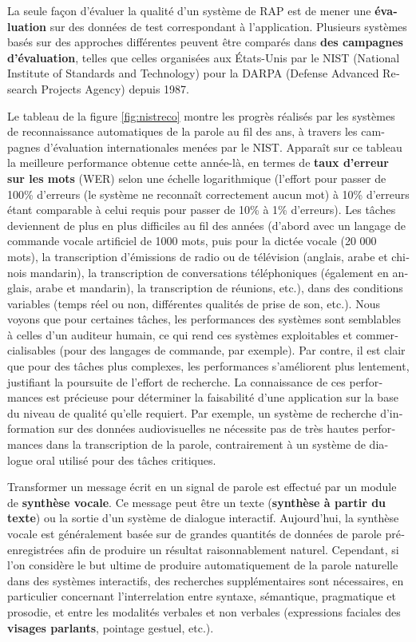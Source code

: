\begin{french}
\begin{multicols}{2}
La seule façon d'évaluer la qualité d'un système de RAP est de mener
une {\bf évaluation} sur des données de test correspondant à
l'application. Plusieurs systèmes basés sur des approches différentes
peuvent être comparés dans {\bf des campagnes d'évaluation}, telles
que celles organisées aux États-Unis par le NIST (National Institute
of Standards and Technology) pour la DARPA (Defense Advanced Research
Projects Agency) depuis 1987.

Le tableau de la figure \ref{fig:nistreco} montre les progrès réalisés
par les systèmes de reconnaissance automatiques de la parole au fil
des ans, à travers les campagnes d'évaluation internationales
menées par le NIST. Apparaît sur ce tableau la meilleure performance
obtenue cette année-là, en termes de {\bf taux d'erreur sur
  les mots} (WER) selon une échelle logarithmique (l'effort
pour passer de 100\% d'erreurs (le système ne reconnaît
correctement aucun mot) à 10\% d'erreurs étant comparable à
celui requis pour passer de 10\% à 1\% d'erreurs). Les tâches
deviennent de plus en plus difficiles au fil des années (d'abord avec un langage de commande vocale artificiel de 1000 mots,
puis pour la dictée vocale (20 000 mots), la transcription d'émissions de radio ou de télévision (anglais, arabe et chinois
mandarin), la transcription de conversations téléphoniques (également
en anglais, arabe et mandarin), la transcription de réunions, etc.),
dans des conditions variables (temps réel ou non, différentes qualités
de prise de son, etc.). Nous voyons que pour certaines tâches, les
performances des systèmes sont semblables à celles d'un
auditeur humain, ce qui rend ces systèmes exploitables et
commercialisables (pour des langages de commande, par exemple). Par
contre, il est clair que pour des tâches plus complexes, les
performances s'améliorent plus lentement, justifiant la
poursuite de l'effort de recherche. La connaissance de ces
performances est précieuse pour déterminer la faisabilité d'une application sur la base du niveau de qualité qu'elle
requiert. Par exemple, un système de recherche d'information 
sur des données audiovisuelles ne nécessite pas de très hautes
performances dans la transcription de la parole, contrairement à un
système de dialogue oral utilisé pour des tâches critiques.

Transformer un message écrit en un signal de parole est effectué par
un module de {\bf synthèse vocale}. Ce message peut être un texte
({\bf synthèse à partir du texte}) ou la sortie d'un système de dialogue
interactif. Aujourd'hui, la synthèse vocale est généralement basée sur
de grandes quantités de données de parole préenregistrées afin de
produire un résultat raisonnablement naturel. Cependant, si l'on
considère le but ultime de produire automatiquement de la parole
naturelle dans des systèmes interactifs, des recherches
supplémentaires sont nécessaires, en particulier concernant
l'interrelation entre syntaxe, sémantique, pragmatique et prosodie, et
entre les modalités verbales et non verbales (expressions faciales des
{\bf visages parlants}, pointage gestuel, etc.).


\end{multicols}
\end{french}
